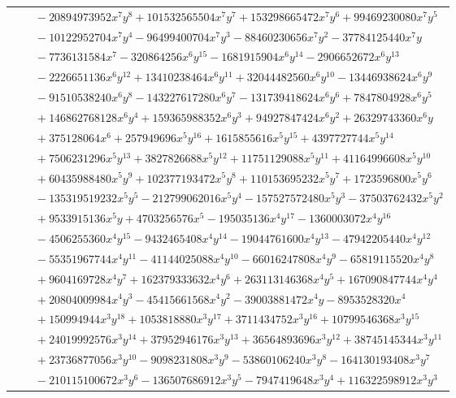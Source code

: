 \documentclass[11pt]{article}
\begin{document}
\begin{longtable}{@{}ll@{}}
 & $\quad -20894973952x^{7}y^{8}+101532565504x^{7}y^{7}+153298665472x^{7}y^{6}+99469230080x^{7}y^{5}$\\
 & $\quad -10122952704x^{7}y^{4}-96499400704x^{7}y^{3}-88460230656x^{7}y^{2}-37784125440x^{7}y$\\
 & $\quad -7736131584x^{7}-320864256x^{6}y^{15}-1681915904x^{6}y^{14}-2906652672x^{6}y^{13}$\\
 & $\quad -2226651136x^{6}y^{12}+13410238464x^{6}y^{11}+32044482560x^{6}y^{10}-13446938624x^{6}y^{9}$\\
 & $\quad -91510538240x^{6}y^{8}-143227617280x^{6}y^{7}-131739418624x^{6}y^{6}+7847804928x^{6}y^{5}$\\
 & $\quad +146862768128x^{6}y^{4}+159365988352x^{6}y^{3}+94927847424x^{6}y^{2}+26329743360x^{6}y$\\
 & $\quad +375128064x^{6}+257949696x^{5}y^{16}+1615855616x^{5}y^{15}+4397727744x^{5}y^{14}$\\
 & $\quad +7506231296x^{5}y^{13}+3827826688x^{5}y^{12}+11751129088x^{5}y^{11}+41164996608x^{5}y^{10}$\\
 & $\quad +60435988480x^{5}y^{9}+102377193472x^{5}y^{8}+110153695232x^{5}y^{7}+1723596800x^{5}y^{6}$\\
 & $\quad -135319519232x^{5}y^{5}-212799062016x^{5}y^{4}-157527572480x^{5}y^{3}-37503762432x^{5}y^{2}$\\
 & $\quad +9533915136x^{5}y+4703256576x^{5}-195035136x^{4}y^{17}-1360003072x^{4}y^{16}$\\
 & $\quad -4506255360x^{4}y^{15}-9432465408x^{4}y^{14}-19044761600x^{4}y^{13}-47942205440x^{4}y^{12}$\\
 & $\quad -55351967744x^{4}y^{11}-41144025088x^{4}y^{10}-66016247808x^{4}y^{9}-65819115520x^{4}y^{8}$\\
 & $\quad +9604169728x^{4}y^{7}+162379333632x^{4}y^{6}+263113146368x^{4}y^{5}+167090847744x^{4}y^{4}$\\
 & $\quad +20804009984x^{4}y^{3}-45415661568x^{4}y^{2}-39003881472x^{4}y-8953528320x^{4}$\\
 & $\quad +150994944x^{3}y^{18}+1053818880x^{3}y^{17}+3711434752x^{3}y^{16}+10799546368x^{3}y^{15}$\\
 & $\quad +24019992576x^{3}y^{14}+37952946176x^{3}y^{13}+36564893696x^{3}y^{12}+38745145344x^{3}y^{11}$\\
 & $\quad +23736877056x^{3}y^{10}-9098231808x^{3}y^{9}-53860106240x^{3}y^{8}-164130193408x^{3}y^{7}$\\
 & $\quad -210115100672x^{3}y^{6}-136507686912x^{3}y^{5}-7947419648x^{3}y^{4}+116322598912x^{3}y^{3}$\\

\end{longtable}
\end{document}
